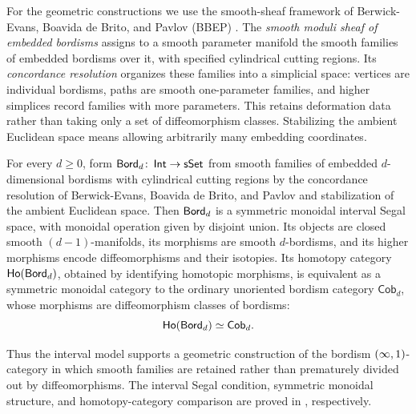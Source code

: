For the geometric constructions we use the smooth-sheaf framework of
Berwick-Evans, Boavida de Brito, and Pavlov (BBEP) \cite{BBEP24}.
The \emph{smooth moduli sheaf of embedded bordisms} assigns to a smooth
parameter manifold the smooth families of embedded bordisms over it, with
specified cylindrical cutting regions. Its \emph{concordance resolution}
organizes these families into a simplicial space: vertices are individual
bordisms, paths are smooth one-parameter families, and higher simplices
record families with more parameters. This retains deformation data rather
than taking only a set of diffeomorphism classes. Stabilizing the ambient
Euclidean space means allowing arbitrarily many embedding coordinates.

\begin{samepage}
\begin{maintheorem}
\label{intro:: thm: smooth bordisms}
For every $d\geq 0$, form $\operatorname{\mathsf{Bord}}_d\colon\operatorname{\mathsf{Int}}\to\operatorname{\sf sSet}$ from smooth families
of embedded $d$-dimensional bordisms with cylindrical cutting regions by
the concordance resolution of Berwick-Evans, Boavida de Brito, and Pavlov
\cite{BBEP24} and stabilization of the ambient Euclidean
space. Then $\operatorname{\mathsf{Bord}}_d$ is a symmetric monoidal interval Segal space, with
monoidal operation given by disjoint union. Its objects are closed smooth
$(d-1)$-manifolds, its morphisms are smooth $d$-bordisms, and its higher
morphisms encode diffeomorphisms and their isotopies. Its homotopy category
$\operatorname{\sf Ho}(\operatorname{\mathsf{Bord}}_d)$, obtained by identifying homotopic morphisms, is equivalent
as a symmetric monoidal category to the ordinary unoriented bordism category
$\mathsf{Cob}_d$, whose morphisms are diffeomorphism classes of bordisms:
\[
    \operatorname{\sf Ho}(\operatorname{\mathsf{Bord}}_d)\simeq\mathsf{Cob}_d.
\]
\end{maintheorem}
\end{samepage}

Thus the interval model supports a geometric construction of the bordism
$(\operatorname{\infty},1)$-category in which smooth families are retained rather than
prematurely divided out by diffeomorphisms. The interval Segal condition,
symmetric monoidal structure, and homotopy-category comparison are proved
in , respectively.

